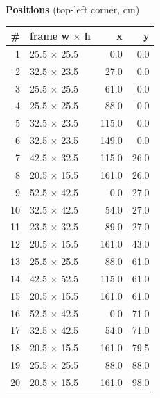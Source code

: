\documentclass[a4paper,landscape,10pt]{article}
\begin{document}
\begin{minipage}[t]{0.25\textwidth}
\vspace{8pt}
{\bfseries Positions} (top-left corner, cm)\\[2pt]
\tiny
\begin{tabular}{@{}r l r r@{}}
\toprule
\# & frame w $\times$ h & x & y \\
\midrule
1 & 25.5 $\times$ 25.5 & 0.0 & 0.0 \\
2 & 32.5 $\times$ 23.5 & 27.0 & 0.0 \\
3 & 25.5 $\times$ 25.5 & 61.0 & 0.0 \\
4 & 25.5 $\times$ 25.5 & 88.0 & 0.0 \\
5 & 32.5 $\times$ 23.5 & 115.0 & 0.0 \\
6 & 32.5 $\times$ 23.5 & 149.0 & 0.0 \\
7 & 42.5 $\times$ 32.5 & 115.0 & 26.0 \\
8 & 20.5 $\times$ 15.5 & 161.0 & 26.0 \\
9 & 52.5 $\times$ 42.5 & 0.0 & 27.0 \\
10 & 32.5 $\times$ 42.5 & 54.0 & 27.0 \\
11 & 23.5 $\times$ 32.5 & 89.0 & 27.0 \\
12 & 20.5 $\times$ 15.5 & 161.0 & 43.0 \\
13 & 25.5 $\times$ 25.5 & 88.0 & 61.0 \\
14 & 42.5 $\times$ 52.5 & 115.0 & 61.0 \\
15 & 20.5 $\times$ 15.5 & 161.0 & 61.0 \\
16 & 52.5 $\times$ 42.5 & 0.0 & 71.0 \\
17 & 32.5 $\times$ 42.5 & 54.0 & 71.0 \\
18 & 20.5 $\times$ 15.5 & 161.0 & 79.5 \\
19 & 25.5 $\times$ 25.5 & 88.0 & 88.0 \\
20 & 20.5 $\times$ 15.5 & 161.0 & 98.0 \\
\bottomrule
\end{tabular}
\end{minipage}
\clearpage
\end{document}

